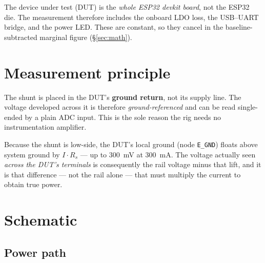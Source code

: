 \documentclass[11pt,a4paper]{article}
\begin{document}
\noindent
The device under test (DUT) is the \emph{whole ESP32 devkit board}, not the ESP32 die.
The measurement therefore includes the onboard LDO loss, the USB--UART bridge, and the
power LED. These are constant, so they cancel in the baseline-subtracted marginal figure
(\S\ref{sec:math}).

\section{Measurement principle}

The shunt is placed in the DUT's \textbf{ground return}, not its supply line. The voltage
developed across it is therefore \emph{ground-referenced} and can be read single-ended by a
plain ADC input. This is the sole reason the rig needs no instrumentation amplifier.

Because the shunt is low-side, the DUT's local ground (node \texttt{E\_GND}) floats above
system ground by $I \cdot R_s$ --- up to \SI{300}{\milli\volt} at \SI{300}{\milli\ampere}.
The voltage actually seen \emph{across the DUT's terminals} is consequently the rail voltage
minus that lift, and it is that difference --- not the rail alone --- that must multiply the
current to obtain true power.

\section{Schematic}

\subsection{Power path}
\end{document}
